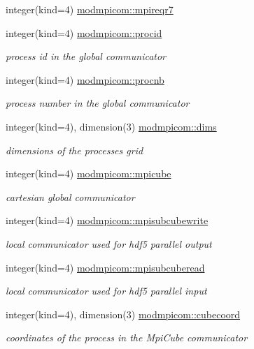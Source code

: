 \begin{DoxyCompactItemize}
integer(kind=4) \hyperlink{namespacemodmpicom_ad55af2a3154bdc4be9156046d29af59d}{modmpicom\+::mpireqr7}
\item 
integer(kind=4) \hyperlink{namespacemodmpicom_a0a592a5f03c3c0d61e07b5a56fd161d1}{modmpicom\+::procid}
\begin{DoxyCompactList}\small\item\em process id in the global communicator \end{DoxyCompactList}\item 
integer(kind=4) \hyperlink{namespacemodmpicom_a5e40853b0f15e4c14658ea56fb1b9b73}{modmpicom\+::procnb}
\begin{DoxyCompactList}\small\item\em process number in the global communicator \end{DoxyCompactList}\item 
integer(kind=4), dimension(3) \hyperlink{namespacemodmpicom_a8762b65024b222a0c5bfab4f8af21d7d}{modmpicom\+::dims}
\begin{DoxyCompactList}\small\item\em dimensions of the processes grid \end{DoxyCompactList}\item 
integer(kind=4) \hyperlink{namespacemodmpicom_a85f71373d318b169e73b6a0221dc62f1}{modmpicom\+::mpicube}
\begin{DoxyCompactList}\small\item\em cartesian global communicator \end{DoxyCompactList}\item 
integer(kind=4) \hyperlink{namespacemodmpicom_aa950234af9f6bdf930d8c4e61a76ca96}{modmpicom\+::mpisubcubewrite}
\begin{DoxyCompactList}\small\item\em local communicator used for hdf5 parallel output \end{DoxyCompactList}\item 
integer(kind=4) \hyperlink{namespacemodmpicom_afee5305bd782226daffc69f8db2af8a7}{modmpicom\+::mpisubcuberead}
\begin{DoxyCompactList}\small\item\em local communicator used for hdf5 parallel input \end{DoxyCompactList}\item 
integer(kind=4), dimension(3) \hyperlink{namespacemodmpicom_a533718abb8ce3f03b430dfbf9f821069}{modmpicom\+::cubecoord}
\begin{DoxyCompactList}\small\item\em coordinates of the process in the Mpi\+Cube communicator \end{DoxyCompactList}\item 

\end{DoxyCompactItemize}
